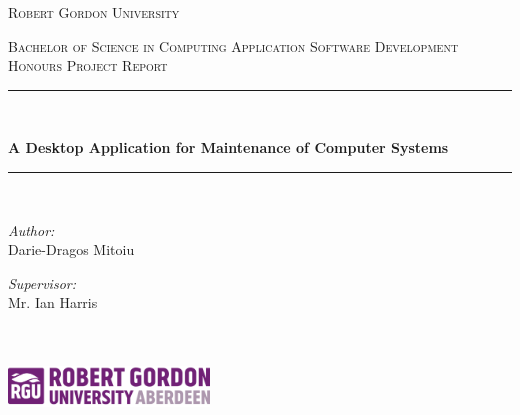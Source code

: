 \begin{titlepage}
    \begin{center}

        \vspace*{.06\textheight}
        {\scshape\LARGE Robert Gordon University\par}\vspace{1.5cm} %
        \textsc{\Large Bachelor of Science in Computing Application Software Development}\\[0.5cm] %
        \textsc{\Large Honours Project Report}
        \vspace{.02\textheight}
        \hrule \\[0.4cm] %
        {\huge \bfseries A Desktop Application for Maintenance of Computer Systems\par}\vspace{0.4cm} %
        \hrule \\[1.5cm] %

        \begin{minipage}[t]{0.4\textwidth}
            \begin{flushleft} \large
            \emph{Author:}\\
            Darie-Dragos Mitoiu
            \end{flushleft}
        \end{minipage}
        \begin{minipage}[t]{0.4\textwidth}
            \begin{flushright} \large
            \emph{Supervisor:} \\
            Mr. Ian Harris
            \end{flushright}
        \end{minipage}\\[3cm]

        {\large \the\year}\\[2cm] %
        \includegraphics[width=0.4\textwidth, angle=0]{images/rgu-logo.pdf} %

    \end{center}
\end{titlepage}
